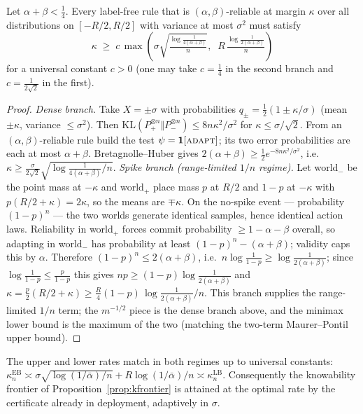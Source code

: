 \begin{proposition}\label{thm:rate-lb}
Let $\alpha+\beta<\tfrac14$. Every label-free rule that is $(\alpha,\beta)$-reliable at
margin $\kappa$ over all distributions on $[-R/2,R/2]$ with variance at most $\sigma^2$
must satisfy
\[
\kappa\;\ge\;c\,\max\!\left(\sigma\sqrt{\tfrac{\log\frac{1}{4(\alpha+\beta)}}{n}},\;\;
R\,\tfrac{\log\frac{1}{2(\alpha+\beta)}}{n}\right)
\]
for a universal constant $c>0$ (one may take $c=\tfrac14$ in the second branch and
$c=\tfrac{1}{2\sqrt2}$ in the first).
\end{proposition}
\begin{proof}
\emph{Dense branch.} Take $X=\pm\sigma$ with probabilities $q_\pm=\tfrac12(1\pm\kappa/\sigma)$
(mean $\pm\kappa$, variance $\le\sigma^2$). Then
$\mathrm{KL}(P_+^{\otimes n}\Vert P_-^{\otimes n})\le 8n\kappa^2/\sigma^2$ for
$\kappa\le\sigma/\sqrt2$. From an $(\alpha,\beta)$-reliable rule build the test
$\psi=\mathbf1[\textsc{adapt}]$; its two error probabilities are each at most
$\alpha+\beta$. Bretagnolle--Huber gives
$2(\alpha+\beta)\ge\tfrac12 e^{-8n\kappa^2/\sigma^2}$, i.e.\
$\kappa\ge\tfrac{\sigma}{2\sqrt2}\sqrt{\log\frac{1}{4(\alpha+\beta)}/n}$.
\emph{Spike branch (range-limited $1/n$ regime).} Let world$_-$ be the point mass at $-\kappa$ and world$_+$ place
mass $p$ at $R/2$ and $1-p$ at $-\kappa$ with $p(R/2+\kappa)=2\kappa$, so the means are
$\mp\kappa$. On the no-spike event --- probability $(1-p)^n$ --- the two worlds generate
identical samples, hence identical action laws. Reliability in world$_+$ forces commit
probability $\ge1-\alpha-\beta$ overall, so adapting in world$_-$ has probability at
least $(1-p)^n-(\alpha+\beta)$; validity caps this by $\alpha$. Therefore
$(1-p)^n\le2(\alpha+\beta)$, i.e.\ $n\log\frac{1}{1-p}\ge\log\frac{1}{2(\alpha+\beta)}$;
since $\log\frac{1}{1-p}\le\frac{p}{1-p}$ this gives $np\ge(1-p)\log\frac{1}{2(\alpha+\beta)}$ and
$\kappa=\tfrac{p}{2}(R/2+\kappa)\ge\tfrac{R}{4}(1-p)\,\log\frac{1}{2(\alpha+\beta)}/n$. This branch
supplies the range-limited $1/n$ term; the $m^{-1/2}$ piece is the dense branch above, and the
minimax lower bound is the maximum of the two (matching the two-term Maurer--Pontil upper bound).
\end{proof}

\begin{proposition}\label{prop:rate-opt}
The upper and lower rates match in both regimes up to universal constants:
$\kappa_n^{\mathrm{EB}}\asymp \sigma\sqrt{\log(1/\bar\alpha)/n}+R\log(1/\bar\alpha)/n
\asymp\kappa_n^{\mathrm{LB}}$. Consequently the knowability frontier of
Proposition~\ref{prop:kfrontier} is attained at the optimal rate by the certificate already
in deployment, adaptively in $\sigma$.
\end{proposition}

